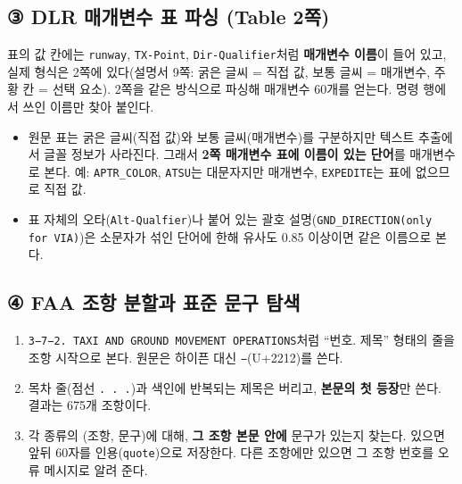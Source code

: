 \documentclass[10pt,a4paper]{article}
\newcommand{\key}[1]{\texttt{\small #1}}
\begin{document}
\subsection{③ DLR 매개변수 표 파싱 (Table 2쪽)}
표의 값 칸에는 \texttt{runway}, \texttt{TX-Point}, \texttt{Dir-Qualifier}처럼 \textbf{매개변수 이름}이 들어 있고, 실제 형식은 2쪽에 있다(설명서 9쪽: 굵은 글씨 = 직접 값, 보통 글씨 = 매개변수, 주황 칸 = 선택 요소). 2쪽을 같은 방식으로 파싱해 매개변수 60개를 얻는다. 명령 행에서 쓰인 이름만 찾아 붙인다.
\begin{itemize}[leftmargin=14pt]
\item 원문 표는 굵은 글씨(직접 값)와 보통 글씨(매개변수)를 구분하지만 텍스트 추출에서 글꼴 정보가 사라진다. 그래서 \textbf{2쪽 매개변수 표에 이름이 있는 단어}를 매개변수로 본다. 예: \texttt{APTR\_COLOR}, \texttt{ATSU}는 대문자지만 매개변수, \texttt{EXPEDITE}는 표에 없으므로 직접 값.
\item 표 자체의 오타(\texttt{Alt-Qualfier})나 붙어 있는 괄호 설명(\texttt{GND\_DIRECTION(only for VIA)})은 소문자가 섞인 단어에 한해 유사도 0.85 이상이면 같은 이름으로 본다.
\end{itemize}

\subsection{④ FAA 조항 분할과 표준 문구 탐색}
\begin{enumerate}[leftmargin=14pt]
\item \texttt{3−7−2. TAXI AND GROUND MOVEMENT OPERATIONS}처럼 ``번호. 제목'' 형태의 줄을 조항 시작으로 본다. 원문은 하이픈 대신 \texttt{−}(U+2212)를 쓴다.
\item 목차 줄(점선 \texttt{. . .})과 색인에 반복되는 제목은 버리고, \textbf{본문의 첫 등장}만 쓴다. 결과는 675개 조항이다.
\item 각 종류의 (조항, 문구)에 대해, \textbf{그 조항 본문 안에} 문구가 있는지 찾는다. 있으면 앞뒤 60자를 인용(\key{quote})으로 저장한다. 다른 조항에만 있으면 그 조항 번호를 오류 메시지로 알려 준다.
\end{enumerate}
\end{document}
